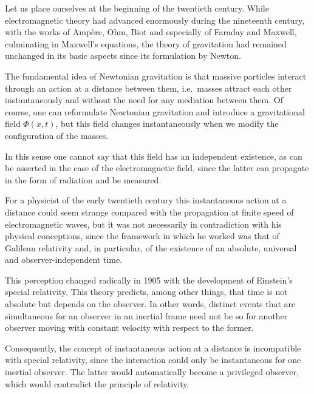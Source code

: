 \begin{points}
\item Let us place ourselves at the beginning of the twentieth century. While electromagnetic theory had advanced enormously during the nineteenth century, with the works of Ampère, Ohm, Biot and especially of Faraday and Maxwell, culminating in Maxwell's equations, the theory of gravitation had remained unchanged in its basic aspects since its formulation by Newton.

\item The fundamental idea of Newtonian gravitation is that massive particles interact through an action at a distance between them, i.e.\ masses attract each other instantaneously and without the need for any mediation between them. Of course, one can reformulate Newtonian gravitation and introduce a gravitational field $\Phi(x,t)$, but this field changes instantaneously when we modify the configuration of the masses.

\item In this sense one cannot say that this field has an independent existence, as can be asserted in the case of the electromagnetic field, since the latter can propagate in the form of radiation and be measured.

\item For a physicist of the early twentieth century this instantaneous action at a distance could seem strange compared with the propagation at finite speed of electromagnetic waves, but it was not necessarily in contradiction with his physical conceptions, since the framework in which he worked was that of Galilean relativity and, in particular, of the existence of an absolute, universal and observer-independent time.

\item This perception changed radically in 1905 with the development of Einstein's special relativity. This theory predicts, among other things, that time is not absolute but depends on the observer. In other words, distinct events that are simultaneous for an observer in an inertial frame need not be so for another observer moving with constant velocity with respect to the former.

\item Consequently, the concept of instantaneous action at a distance is incompatible with special relativity, since the interaction could only be instantaneous for one inertial observer. The latter would automatically become a privileged observer, which would contradict the principle of relativity.


\end{points}
